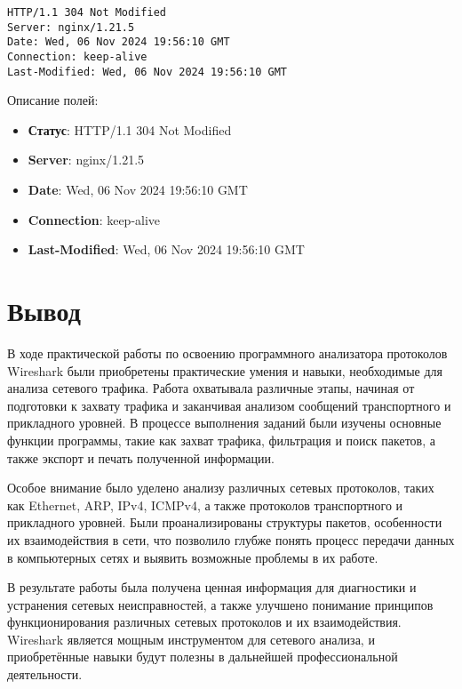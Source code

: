 \begin{verbatim}
HTTP/1.1 304 Not Modified
Server: nginx/1.21.5
Date: Wed, 06 Nov 2024 19:56:10 GMT
Connection: keep-alive
Last-Modified: Wed, 06 Nov 2024 19:56:10 GMT
\end{verbatim}

Описание полей:

\begin{itemize}
    \item \textbf{Статус}: HTTP/1.1 304 Not Modified
    \item \textbf{Server}: nginx/1.21.5
    \item \textbf{Date}: Wed, 06 Nov 2024 19:56:10 GMT
    \item \textbf{Connection}: keep-alive
    \item \textbf{Last-Modified}: Wed, 06 Nov 2024 19:56:10 GMT
\end{itemize}

\clearpage

\section*{Вывод}

В ходе практической работы по освоению программного анализатора протоколов Wireshark были приобретены практические умения и навыки, необходимые для анализа сетевого трафика. Работа охватывала различные этапы, начиная от подготовки к захвату трафика и заканчивая анализом сообщений транспортного и прикладного уровней. В процессе выполнения заданий были изучены основные функции программы, такие как захват трафика, фильтрация и поиск пакетов, а также экспорт и печать полученной информации.

Особое внимание было уделено анализу различных сетевых протоколов, таких как Ethernet, ARP, IPv4, ICMPv4, а также протоколов транспортного и прикладного уровней. Были проанализированы структуры пакетов, особенности их взаимодействия в сети, что позволило глубже понять процесс передачи данных в компьютерных сетях и выявить возможные проблемы в их работе.

В результате работы была получена ценная информация для диагностики и устранения сетевых неисправностей, а также улучшено понимание принципов функционирования различных сетевых протоколов и их взаимодействия. Wireshark является мощным инструментом для сетевого анализа, и приобретённые навыки будут полезны в дальнейшей профессиональной деятельности.


